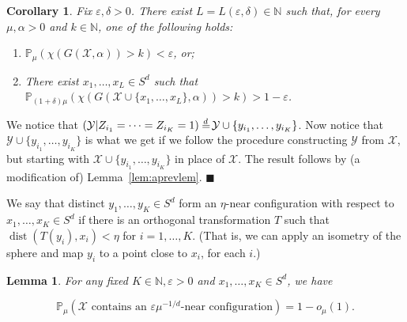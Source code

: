 \documentclass[11pt]{article}%
\newenvironment{proof}{\vspace{1ex}\noindent{\bf Proof.}}{\hspace*{\fill}$\blacksquare$\vspace{1ex}}
\newtheorem{lemma}[lemma]{Lemma}
\newtheorem{corollary}[corollary]{Corollary}
\newcommand{\Xcal}[0]{\ensuremath{{\mathcal X}}}
\newcommand{\Ycal}[0]{\ensuremath{{\mathcal Y}}}
\newcommand{\eN}[0]{\ensuremath{ \mathbb N}}
\newcommand{\Pee}[0]{\ensuremath{{\mathbb P}}}
\newcommand{\isd}[0]{\hspace{.2ex} \raisebox{-.1ex}{$=$} \hspace{-1.5ex} 
\raisebox{1ex}{{$\scriptstyle d$}} \hspace{.8ex} }
\newcommand{\eps}{\varepsilon}
\DeclareMathOperator{\dist}{dist}
\begin{document}
\begin{corollary}\label{cor:contcor}
Fix $\eps,\delta > 0$. There exist
$L=L(\eps,\delta) \in \eN$ such that, for every $\mu,\alpha>0$ and $k \in \eN$, one of
the following holds:

\begin{enumerate}
 \item $\Pee_{\mu}( \chi( G(\Xcal,\alpha) ) > k ) < \eps$, or;
 
 \item There exist $x_1,\dots,x_L \in S^d$ such that
 $\Pee_{(1+\delta)\mu}( \chi(G(\Xcal \cup \{x_1,\dots,x_L\},\alpha)) > k ) > 1-\eps$.
\end{enumerate}
\end{corollary}

\begin{proof}
We notice that $\left(\Ycal|Z_{i_1}=\dots=Z_{i_K}=1\right) 
\isd \Ycal \cup \{y_{i_1},\dots,y_{i_K}\}$.
Now notice that $\Ycal \cup \{y_{i_1},\dots,y_{i_K}\}$ is
what we get if we follow the procedure constructing $\Ycal$ from $\Xcal$, but 
starting with $\Xcal \cup \{y_{i_1},\dots,y_{i_K}\}$ in place of $\Xcal$.
The result follows by (a modification of) Lemma~\ref{lem:aprevlem}.
\end{proof}

 
We say that distinct $y_1,\dots,y_K \in S^d$ form an $\eta$-near configuration with respect to $x_1,\dots,x_K \in S^d$
if there is an orthogonal transformation $T$ 
such that $\dist(T(y_i),x_i) < \eta$ for $i=1,\dots,K$.
(That is, we can apply an isometry of the sphere and 
map $y_i$ to a point close to $x_i$, for each $i$.)

\begin{lemma}
 For any fixed $K \in \eN, \eps > 0$ and $x_1,\dots,x_K \in S^d$, we have 
 
 $$ \Pee_\mu( \text{$\Xcal$ contains an $\eps \mu^{-1/d}$-near configuration} ) = 1 - o_\mu(1). $$
 
\end{lemma}
\end{document}
